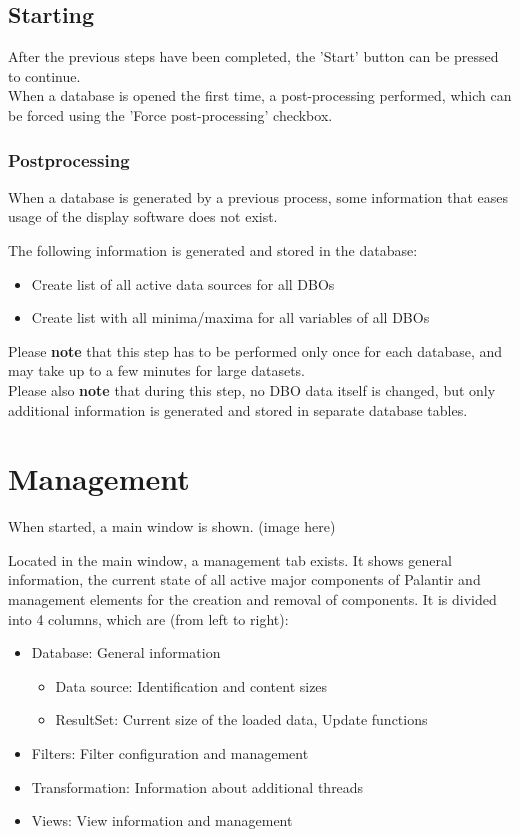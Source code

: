 \documentclass[10pt,letterpaper,extrafontsizes]{memoir}
\begin{document}
\subsection{Starting}

After the previous steps have been completed, the 'Start' button can be pressed to continue. \\

When a database is opened the first time, a post-processing performed, which can be forced using the 'Force post-processing' checkbox.

\subsubsection{Postprocessing}
When a database is generated by a previous process,  some information that eases usage of the display software does not exist. 

The following information is generated and stored in the database:

\begin{itemize}  
\item Create list of all active data sources for all DBOs
\item Create list with all minima/maxima for all variables of all DBOs
\end{itemize}

Please \textbf{note} that this step has to be performed only once for each database, and may take up to a few minutes for large datasets. \\

Please also \textbf{note} that during this step, no DBO data itself is changed, but only additional information is generated and stored in separate database tables.

\section{Management}
\label{sec:management}

When started, a main window is shown.
(image here)

Located in the main window, a management tab exists.  It shows general information, the current state
of  all  active  major  components  of  Palantir  and  management  elements  for  the  creation  and  removal  of
components. It is divided into 4 columns, which are (from left to right):

\begin{itemize}  
\item Database: General information
\begin{itemize}  
\item Data source: Identification and content sizes
\item ResultSet: Current size of the loaded data, Update functions
\end{itemize}
\item Filters: Filter configuration and management
\item Transformation: Information about additional threads
\item Views: View information and management
\end{itemize}
\end{document}
